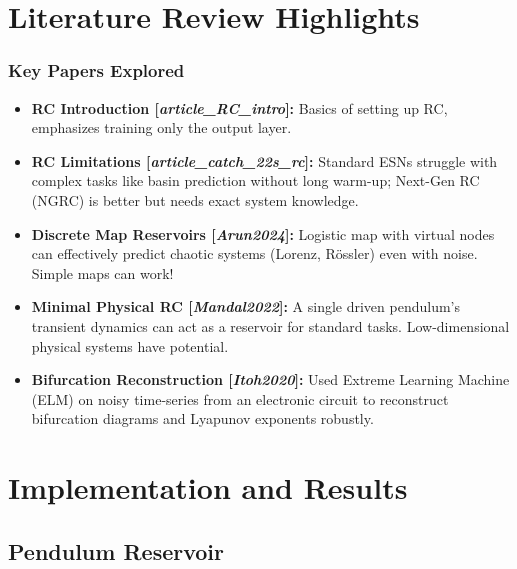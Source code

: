 \documentclass{beamer}
\begin{document}
\section{Literature Review Highlights}

\begin{frame}
    \frametitle{Key Papers Explored}
    \begin{itemize}
        \item \textbf{RC Introduction [\textit{article\_RC\_intro}]:} Basics of setting up RC, emphasizes training only the output layer.
        \pause
        \item \textbf{RC Limitations [\textit{article\_catch\_22s\_rc}]:} Standard ESNs struggle with complex tasks like basin prediction without long warm-up; Next-Gen RC (NGRC) is better but needs exact system knowledge.
        \pause
        \item \textbf{Discrete Map Reservoirs [\textit{Arun2024}]:} Logistic map with virtual nodes can effectively predict chaotic systems (Lorenz, Rössler) even with noise. Simple maps can work!
        \pause
        \item \textbf{Minimal Physical RC [\textit{Mandal2022}]:} A single driven pendulum's transient dynamics can act as a reservoir for standard tasks. Low-dimensional physical systems have potential.
        \pause
        \item \textbf{Bifurcation Reconstruction [\textit{Itoh2020}]:} Used Extreme Learning Machine (ELM) on noisy time-series from an electronic circuit to reconstruct bifurcation diagrams and Lyapunov exponents robustly.
    \end{itemize}
\end{frame}

\section{Implementation and Results}

\subsection{Pendulum Reservoir}
\end{document}
